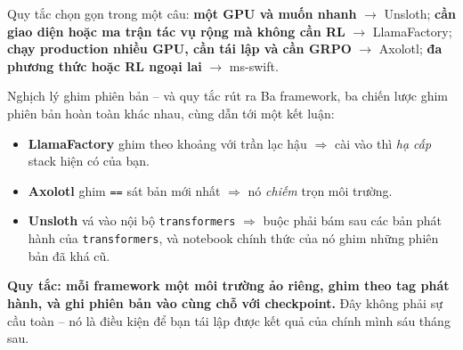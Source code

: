 \noindent Quy tắc chọn gọn trong một câu: \textbf{một GPU và muốn nhanh} $\rightarrow$ Unsloth; \textbf{cần giao diện hoặc ma trận tác vụ rộng mà không cần RL} $\rightarrow$ LlamaFactory; \textbf{chạy production nhiều GPU, cần tái lập và cần GRPO} $\rightarrow$ Axolotl; \textbf{đa phương thức hoặc RL ngoại lai} $\rightarrow$ ms-swift.

\begin{pitfall}{Nghịch lý ghim phiên bản -- và quy tắc rút ra}
Ba framework, ba chiến lược ghim phiên bản hoàn toàn khác nhau, cùng dẫn tới một kết luận:
\begin{itemize}
	\item \textbf{LlamaFactory} ghim theo khoảng với trần lạc hậu $\Rightarrow$ cài vào thì \emph{hạ cấp} stack hiện có của bạn.
	\item \textbf{Axolotl} ghim \texttt{==} sát bản mới nhất $\Rightarrow$ nó \emph{chiếm} trọn môi trường.
	\item \textbf{Unsloth} vá vào nội bộ \texttt{transformers} $\Rightarrow$ buộc phải bám sau các bản phát hành của \texttt{transformers}, và notebook chính thức của nó ghim những phiên bản đã khá cũ.
\end{itemize}
\textbf{Quy tắc: mỗi framework một môi trường ảo riêng, ghim theo tag phát hành, và ghi phiên bản vào cùng chỗ với checkpoint.} Đây không phải sự cầu toàn -- nó là điều kiện để bạn tái lập được kết quả của chính mình sáu tháng sau.
\end{pitfall}
